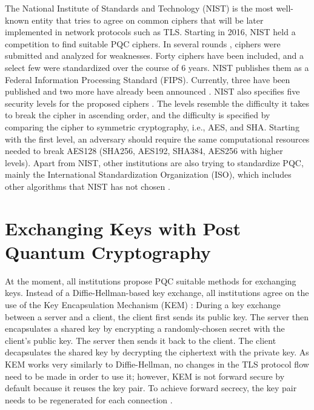 \documentclass[public,noindent]{aisecreport}
\begin{document}
The National Institute of Standards and Technology (NIST) is the most well-known entity that tries to agree on common ciphers that will be later implemented in network protocols such as TLS. Starting in 2016, NIST held a competition to find suitable PQC ciphers. In several rounds \cite{moody2019status, alagic2020status, alagic2022status, alagic2025status}, ciphers were submitted and analyzed for weaknesses. Forty ciphers have been included, and a select few were standardized over the course of 6 years. NIST publishes them as a Federal Information Processing Standard (FIPS). Currently, three have been published \cite{unknown-author-2024, unknown-author-2024-2, unknown-author-2024-3} and two more have already been announced \cite{boutin-2025-2, Boutin_2025}. NIST also specifies five security levels for the proposed ciphers \cite{national2016submission}. The levels resemble the difficulty it takes to break the cipher in ascending order, and the difficulty is specified by comparing the cipher to symmetric cryptography, i.e., AES, and SHA. Starting with the first level, an adversary should require the same computational resources needed to break AES128 (SHA256, AES192, SHA384, AES256 with higher levels). Apart from NIST, other institutions are also trying to standardize PQC, mainly the International Standardization Organization (ISO), which includes other algorithms that NIST has not chosen \cite{ISO86890}. 

\section{Exchanging Keys with Post Quantum Cryptography}

At the moment, all institutions propose PQC suitable methods for exchanging keys. Instead of a Diffie-Hellman-based key exchange, all institutions agree on the use of the Key Encapsulation Mechanism (KEM) \cite{fipskem}: During a key exchange between a server and a client, the client first sends its public key. The server then encapsulates a shared key by encrypting a randomly-chosen secret with the client's public key. The server then sends it back to the client. The client decapsulates the shared key by decrypting the ciphertext with the private key. As KEM works very similarly to Diffie-Hellman, no changes in the TLS protocol flow need to be made in order to use it; however, KEM is not forward secure by default because it reuses the key pair. To achieve forward secrecy, the key pair needs to be regenerated for each connection \cite{sfluhrer-cfrg-ml-kem-security-considerations-03}. 
\end{document}
